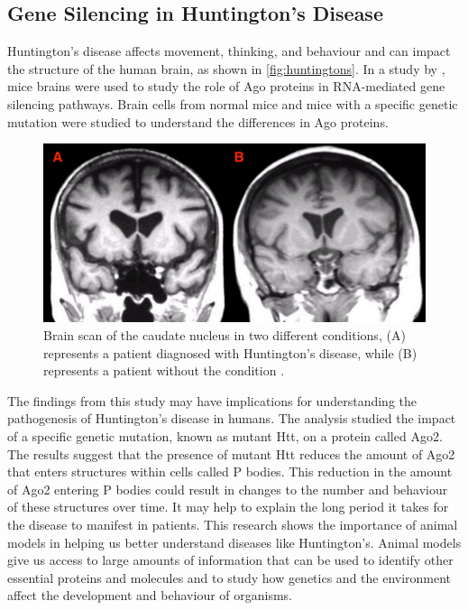 \documentclass[10pt]{article}
\begin{document}
\begin{sloppypar}
  \subsection{Gene Silencing in Huntington’s Disease}
  \label{sec:huntingtons}

  Huntington’s disease affects movement, thinking, and behaviour and can impact the structure of the human brain, as shown in \autoref{fig:huntingtons}. In a study by \cite{savas_huntingtons_2008}, mice brains were used to study the role of Ago proteins in RNA-mediated gene silencing pathways. Brain cells from normal mice and mice with a specific genetic mutation were studied to understand the differences in Ago proteins.

  \begin{figure}[ht]
    \centering
    \includegraphics[width=\textwidth]{figures/huntington.jpg}
    \caption[Brain scan of the caudate nucleus in two different conditions, (A) represents a patient diagnosed with Huntington’s disease, while (B) represents a patient without the condition]{Brain scan of the caudate nucleus in two different conditions, (A) represents a patient diagnosed with Huntington’s disease, while (B) represents a patient without the condition \citep{c_preston_huntingtons_nodate}.}
    \label{fig:huntingtons}
  \end{figure}

  The findings from this study may have implications for understanding the pathogenesis of Huntington’s disease in humans. The analysis studied the impact of a specific genetic mutation, known as mutant Htt, on a protein called Ago2. The results suggest that the presence of mutant Htt reduces the amount of Ago2 that enters structures within cells called P bodies. This reduction in the amount of Ago2 entering P bodies could result in changes to the number and behaviour of these structures over time. It may help to explain the long period it takes for the disease to manifest in patients. This research shows the importance of animal models in helping us better understand diseases like Huntington’s. Animal models give us access to large amounts of information that can be used to identify other essential proteins and molecules and to study how genetics and the environment affect the development and behaviour of organisms.


\end{sloppypar}
\end{document}
